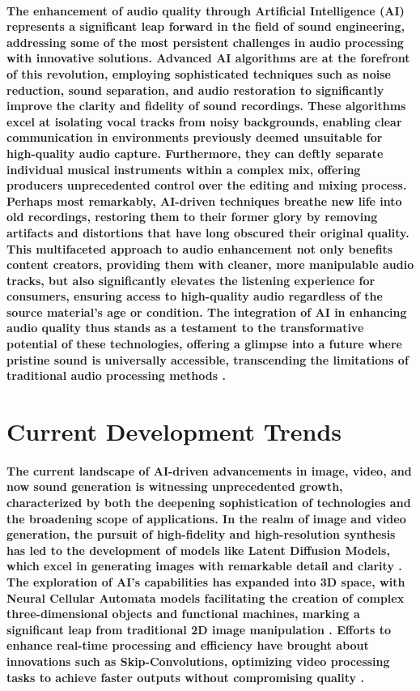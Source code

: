 \documentclass[11pt,a4paper,oneside]{report}
\begin{document}
\paragraph{The enhancement of audio quality through Artificial Intelligence (AI) represents a significant leap forward in the field of sound engineering, addressing some of the most persistent challenges in audio processing with innovative solutions. Advanced AI algorithms are at the forefront of this revolution, employing sophisticated techniques such as noise reduction, sound separation, and audio restoration to significantly improve the clarity and fidelity of sound recordings. These algorithms excel at isolating vocal tracks from noisy backgrounds, enabling clear communication in environments previously deemed unsuitable for high-quality audio capture. Furthermore, they can deftly separate individual musical instruments within a complex mix, offering producers unprecedented control over the editing and mixing process. Perhaps most remarkably, AI-driven techniques breathe new life into old recordings, restoring them to their former glory by removing artifacts and distortions that have long obscured their original quality. This multifaceted approach to audio enhancement not only benefits content creators, providing them with cleaner, more manipulable audio tracks, but also significantly elevates the listening experience for consumers, ensuring access to high-quality audio regardless of the source material's age or condition. The integration of AI in enhancing audio quality thus stands as a testament to the transformative potential of these technologies, offering a glimpse into a future where pristine sound is universally accessible, transcending the limitations of traditional audio processing methods \cite{valentini2018speech}.}

\section{Current Development Trends}

\paragraph{The current landscape of AI-driven advancements in image, video, and now sound generation is witnessing unprecedented growth, characterized by both the deepening sophistication of technologies and the broadening scope of applications. In the realm of image and video generation, the pursuit of high-fidelity and high-resolution synthesis has led to the development of models like Latent Diffusion Models, which excel in generating images with remarkable detail and clarity \cite{rombach2022high}. The exploration of AI's capabilities has expanded into 3D space, with Neural Cellular Automata models facilitating the creation of complex three-dimensional objects and functional machines, marking a significant leap from traditional 2D image manipulation \cite{sudhakaran2021growing}. Efforts to enhance real-time processing and efficiency have brought about innovations such as Skip-Convolutions, optimizing video processing tasks to achieve faster outputs without compromising quality \cite{habibian2021skip}.}
\end{document}
